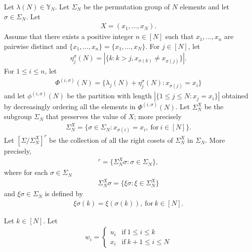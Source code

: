 \documentclass[11pt]{amsart}
\theoremstyle{plain}
\theoremstyle{definition}
\theoremstyle{remark}
\newcommand\YY{\mathbb{Y}}
\numberwithin{equation}{section}
\numberwithin{theorem}{section}
\numberwithin{figure}{section}
\begin{document}
Let $\lambda(N)\in \YY_N$. Let $\Sigma_N$ be the permutation group of $N$ elements and let $\sigma\in \Sigma_N$. Let 
\begin{eqnarray*}
X=(x_1,\ldots,x_N).
\end{eqnarray*}
Assume that there exists a positive integer $n\in[N]$ such that $x_1,...,x_n$ are pairwise distinct and $\{x_1,...,x_n\}=\{x_1,...,x_N\}$. For $j\in[N]$, let
\begin{eqnarray}
\eta_j^{\sigma}(N)=|\{k:k>j,x_{\sigma(k)}\neq x_{\sigma(j)}\}|.\label{et}
\end{eqnarray}
For $1\leq i\leq n$, let
\begin{eqnarray}
\Phi^{(i,\sigma)}(N)=\{\lambda_j(N)+\eta_j^{\sigma}(N):x_{\sigma(j)}=x_i\}\label{pis}
\end{eqnarray}
and let $\phi^{(i,\sigma)}(N)$ be the partition with length $|\{1\leq j\leq N: x_j=x_i\}|$ obtained by decreasingly ordering all the elements in $\Phi^{(i,\sigma)}(N)$. Let $\Sigma_N^{X}$ be the subgroup $\Sigma_N$ that preserves the value of $X$; more precisely
\begin{eqnarray*}
\Sigma_N^{X}=\{\sigma\in \Sigma_N: x_{\sigma(i)}=x_i,\ \mathrm{for}\ i\in[N]\}.
\end{eqnarray*}
Let $[\Sigma/\Sigma_N^X]^r$ be the collection of all the right cosets of $\Sigma_N^X$ in $\Sigma_N$. More precisely,
\begin{eqnarray*}
[\Sigma/\Sigma_N^X]^r=\{\Sigma_N^X\sigma:\sigma\in \Sigma_N\},
\end{eqnarray*}
where for each $\sigma\in \Sigma_N$
\begin{eqnarray*}
\Sigma_N^X\sigma=\{\xi\sigma:\xi\in \Sigma_N^X\}
\end{eqnarray*}
and $\xi\sigma\in \Sigma_N$ is defined by
\begin{eqnarray*}
\xi\sigma(k)=\xi(\sigma(k)),\ \mathrm{for}\ k\in[N].
\end{eqnarray*}

Let $k\in[N]$. Let
\begin{eqnarray}
\label{dw}w_{i}=\left\{\begin{array}{cc}u_i&\mathrm{if}\ 1\leq i\leq k\\x_i&\mathrm{if}\ k+1\leq i\leq N\end{array}\right.
\end{eqnarray}
\end{document}
